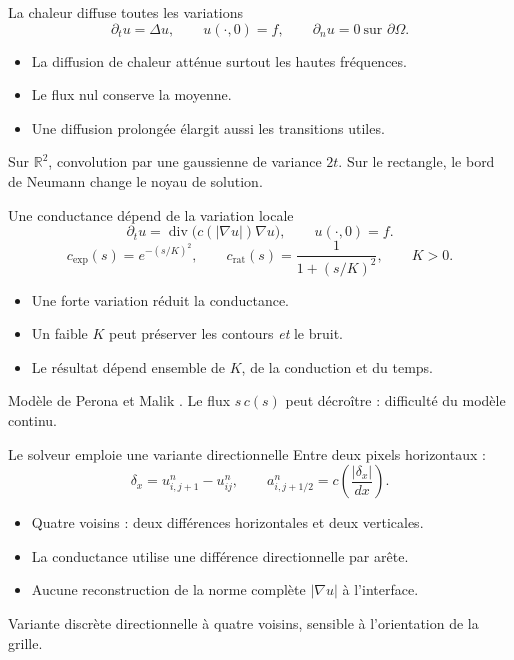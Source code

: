 \documentclass[aspectratio=169,11pt]{beamer}
\newcommand{\smallgap}{\vspace{0.18cm}}
\begin{document}
\begin{frame}[label=chaleur]{La chaleur diffuse toutes les variations}
  \[
    \partial_tu=\Delta u,\qquad u(\cdot,0)=f,\qquad
    \partial_nu=0\ \text{sur }\partial\Omega.
  \]
  \begin{itemize}
    \item La diffusion de chaleur atténue surtout les hautes fréquences.
    \item Le flux nul conserve la moyenne.
    \item Une diffusion prolongée élargit aussi les transitions utiles.
  \end{itemize}
  \smallgap
  Sur $\mathbb R^2$, convolution par une gaussienne de variance $2t$.
  Sur le rectangle, le bord de Neumann change le noyau de solution.
\end{frame}

\begin{frame}[label=pm]{Une conductance dépend de la variation locale}
  \[
    \partial_tu=\operatorname{div}\bigl(c(|\nabla u|)\nabla u\bigr),
    \qquad u(\cdot,0)=f.
  \]
  \[
    c_{\exp}(s)=e^{-(s/K)^2},\qquad
    c_{\mathrm{rat}}(s)=\frac{1}{1+(s/K)^2},\qquad K>0.
  \]
  \begin{itemize}
    \item Une forte variation réduit la conductance.
    \item Un faible $K$ peut préserver les contours \emph{et} le bruit.
    \item Le résultat dépend ensemble de $K$, de la conduction et du temps.
  \end{itemize}
  {\footnotesize Modèle de Perona et Malik \cite{perona1990}.
  Le flux $s\,c(s)$ peut décroître : difficulté du modèle continu.}
\end{frame}

\begin{frame}[label=directionnel]{Le solveur emploie une variante directionnelle}
  Entre deux pixels horizontaux :
  \[
    \delta_x=u^n_{i,j+1}-u^n_{ij},\qquad
    a^n_{i,j+1/2}=c\!\left(\frac{|\delta_x|}{dx}\right).
  \]
  \begin{itemize}
    \item Quatre voisins : deux différences horizontales et deux verticales.
    \item La conductance utilise une différence directionnelle par arête.
    \item Aucune reconstruction de la norme complète $|\nabla u|$ à l'interface.
  \end{itemize}
  \smallgap
  Variante discrète directionnelle à quatre voisins, sensible à
  l'orientation de la grille.
\end{frame}
\end{document}
